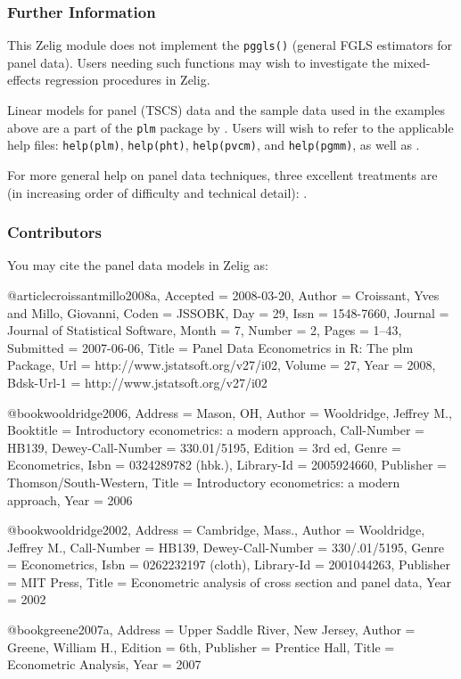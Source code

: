 \subsubsection{Further Information}

This Zelig module does not implement the %
\texttt{pggls()} (general FGLS estimators for panel data). Users needing such functions may wish to investigate the mixed-effects regression procedures in Zelig.

Linear models for panel (TSCS) data and the sample data used in the examples above are a part
of the \texttt{plm} package by \citeauthor{croissantmillo2008a}. Users will wish to refer to the applicable help files: \texttt{help(plm)}, \texttt{help(pht)}, \texttt{help(pvcm)}, and \texttt{help(pgmm)}, as well as \citet{croissantmillo2008a}. 

For more general help on panel data techniques, three excellent treatments are (in increasing order of difficulty and technical detail): \citet{wooldridge2006, greene2007a, wooldridge2002}.

\subsubsection{Contributors}
You may cite the panel data models in Zelig as:


@article{croissantmillo2008a,
	Accepted = {2008-03-20},
	Author = {Croissant, Yves and Millo, Giovanni},
	Coden = {JSSOBK},
	Day = {29},
	Issn = {1548-7660},
	Journal = {Journal of Statistical Software},
	Month = {7},
	Number = {2},
	Pages = {1--43},
	Submitted = {2007-06-06},
	Title = {Panel Data Econometrics in R: The plm Package},
	Url = {http://www.jstatsoft.org/v27/i02},
	Volume = {27},
	Year = {2008},
	Bdsk-Url-1 = {http://www.jstatsoft.org/v27/i02}}
	

@book{wooldridge2006,
	Address = {Mason, OH},
	Author = {Wooldridge, Jeffrey M.},
	Booktitle = {Introductory econometrics: a modern approach},
	Call-Number = {HB139},
	Dewey-Call-Number = {330.01/5195},
	Edition = {3rd ed},
	Genre = {Econometrics},
	Isbn = {0324289782 (hbk.)},
	Library-Id = {2005924660},
	Publisher = {Thomson/South-Western},
	Title = {Introductory econometrics: a modern approach},
	Year = {2006}}


@book{wooldridge2002,
	Address = {Cambridge, Mass.},
	Author = {Wooldridge, Jeffrey M.},
	Call-Number = {HB139},
	Dewey-Call-Number = {330/.01/5195},
	Genre = {Econometrics},
	Isbn = {0262232197 (cloth)},
	Library-Id = {2001044263},
	Publisher = {MIT Press},
	Title = {Econometric analysis of cross section and panel data},
	Year = {2002}}

@book{greene2007a,
	Address = {Upper Saddle River, New Jersey},
	Author = {Greene, William H.},
	Edition = {6th},
	Publisher = {Prentice Hall},
	Title = {Econometric Analysis},
	Year = {2007}}
